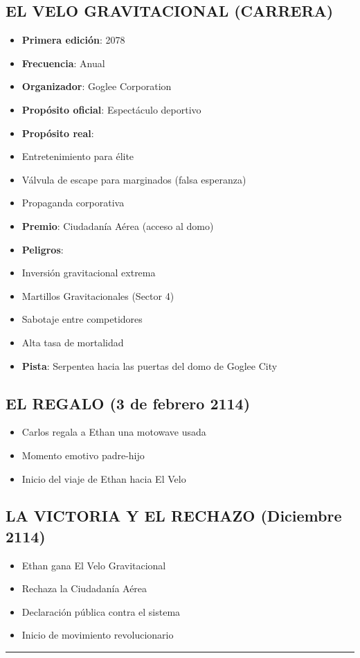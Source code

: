 \documentclass[11pt,a4paper]{report}
\begin{document}
\subsection{EL VELO GRAVITACIONAL (CARRERA)}
\begin{itemize}
  \item \textbf{Primera edición}: 2078
  \item \textbf{Frecuencia}: Anual
  \item \textbf{Organizador}: Goglee Corporation
  \item \textbf{Propósito oficial}: Espectáculo deportivo
  \item \textbf{Propósito real}: 
  \item Entretenimiento para élite
  \item Válvula de escape para marginados (falsa esperanza)
  \item Propaganda corporativa
  \item \textbf{Premio}: Ciudadanía Aérea (acceso al domo)
  \item \textbf{Peligros}:
  \item Inversión gravitacional extrema
  \item Martillos Gravitacionales (Sector 4)
  \item Sabotaje entre competidores
  \item Alta tasa de mortalidad
  \item \textbf{Pista}: Serpentea hacia las puertas del domo de Goglee City

\end{itemize}
\subsection{EL REGALO (3 de febrero 2114)}
\begin{itemize}
  \item Carlos regala a Ethan una motowave usada
  \item Momento emotivo padre-hijo
  \item Inicio del viaje de Ethan hacia El Velo

\end{itemize}
\subsection{LA VICTORIA Y EL RECHAZO (Diciembre 2114)}
\begin{itemize}
  \item Ethan gana El Velo Gravitacional
  \item Rechaza la Ciudadanía Aérea
  \item Declaración pública contra el sistema
  \item Inicio de movimiento revolucionario

\end{itemize}
\bigskip\hrule\bigskip
\end{document}
